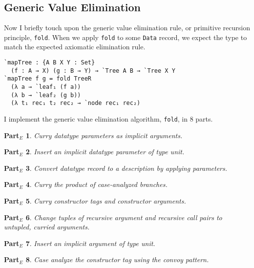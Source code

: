 \documentclass[runningheads,a4paper]{llncs}
\newtheorem{myparte}{Part$_E$}
\begin{document}
\subsection{Generic Value Elimination}

Now I briefly touch upon the generic value elimination rule, or
primitive recursion principle, {\tt fold}. When we apply {\tt fold} to
some {\tt Data} record, we expect the type to match the expected
axiomatic elimination rule.

\begin{verbatim}
`mapTree : {A B X Y : Set}
  (f : A → X) (g : B → Y) → `Tree A B → `Tree X Y
`mapTree f g = fold TreeR
  (λ a → `leaf₁ (f a))
  (λ b → `leaf₂ (g b))
  (λ t₁ rec₁ t₂ rec₂ → `node rec₁ rec₂)
\end{verbatim}

I implement the generic value elimination algorithm,
{\tt fold}, in 8 parts.

\begin{myparte}
\label{parte:one}
Curry datatype parameters as implicit arguments.
\end{myparte}

\begin{myparte}
\label{parte:two}
Insert an implicit datatype parameter of type unit.
\end{myparte}

\begin{myparte}
\label{parte:three}
Convert datatype record to a description by applying parameters.
\end{myparte}

\begin{myparte}
\label{parte:four}
Curry the product of case-analyzed branches.
\end{myparte}

\begin{myparte}
\label{parte:five}
Curry constructor tags and constructor arguments.
\end{myparte}

\begin{myparte}
\label{parte:six}
Change tuples of recursive argument and recursive call pairs to
untupled, curried arguments.
\end{myparte}

\begin{myparte}
\label{parte:seven}
Insert an implicit argument of type unit.
\end{myparte}

\begin{myparte}
\label{parte:eight}
Case analyze the constructor tag using the convoy pattern.
\end{myparte}
\end{document}
